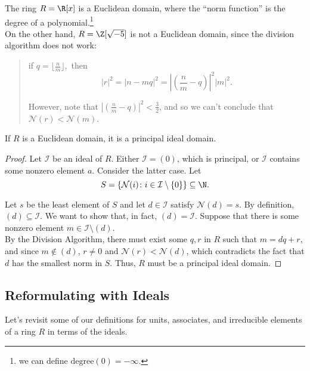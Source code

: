 \documentclass[11pt]{article}
\begin{document}
\begin{remark}
The ring $R = \R[x]$ is a Euclidean domain, where the ``norm function'' is the degree of a polynomial.\footnote{we can define $\mathrm{degree}(0) = -\infty$.} \\

On the other hand, $R = \Z[\sqrt{-5}]$ is not a Euclidean domain, since the division algorithm does not work:    \begin{quote}
    if $q = \lfloor \frac{n}{m} \rfloor,$ then 
    \[
        |r|^2 = |n - mq|^2 = \left| \left( \frac{n}{m} - q \right) \right|^2 |m|^2.
    \]

    However, note that $\left| \left( \frac{n}{m} - q \right) \right|^2 < \frac{3}{2}$, and so we can't conclude that $\mathcal{N}(r) < \mathcal{N}(m)$.
    \end{quote}
\end{remark}

\begin{theorem}
If $R$ is a Euclidean domain, it is a principal ideal domain.
\end{theorem}

\begin{proof}
Let $\mathcal{I} $ be an ideal of $R$. Either $\mathcal{I} = (0)$, which is principal, or $\mathcal{I} $ contains some nonzero element $a$.
Consider the latter case. Let 
\[
    S = \{ \mathcal{N}(i) \colon i \in \mathcal{I} \setminus \{ 0 \}  \} \subseteq \N.
\]

Let $s$ be the least element of $S$ and let $d \in \mathcal{I}$ satisfy $\mathcal{N} (d) = s$. By definition, $(d) \subseteq \mathcal{I}$. 
We want to show that, in fact, $(d) = \mathcal{I}$. Suppose that there is some nonzero element $m \in \mathcal{I} \setminus (d).$ \\

By the Division Algorithm, there must exist some $q, r$ in $R$ such that $m = dq + r$, and since $m \notin (d)$, $r \neq 0$ and $\mathcal{N} (r) < \mathcal{N} (d)$, which
contradicts the fact that $d$ has the smallest norm in $S$. Thus, $R$ must be a principal ideal domain.
\end{proof}

\subsection{Reformulating with Ideals}
Let's revisit some of our definitions for units, associates, and irreducible elements of a ring $R$ in terms of the ideals.
\end{document}

